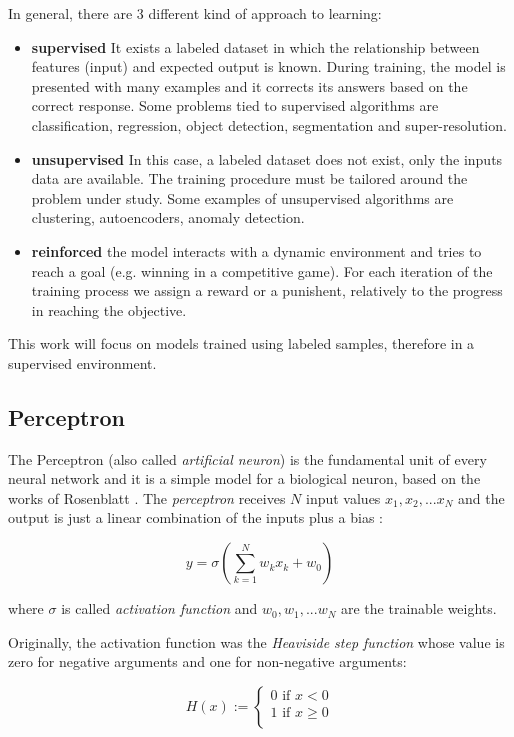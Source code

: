 \documentclass[12pt,a4paper]{report}
\begin{document}
In general, there are 3 different kind of approach to learning:

\begin{itemize}
 \item {\bf supervised} It exists a labeled dataset in which the relationship between features (input) and expected output is known. 
 During training, the model is presented with many examples and it corrects its answers based on the correct response.  
 Some problems tied to supervised algorithms are classification, regression, object detection, segmentation and super-resolution.
 \item {\bf unsupervised} In this case, a labeled dataset does not exist, only the inputs data are available. 
 The training procedure must be tailored around the problem under study. Some examples of unsupervised algorithms are clustering, autoencoders, anomaly detection.
 \item {\bf reinforced} the model interacts with a dynamic environment and tries to reach a goal (e.g. winning in a competitive game). 
 For each iteration of the training process we assign a reward or a punishent, relatively to the progress in reaching the objective.
\end{itemize}

This work will focus on models trained using labeled samples, therefore in a supervised environment.

\subsection*{Perceptron}

The Perceptron (also called \textit{artificial neuron}) is the fundamental unit of every neural network and it is a simple model for a biological neuron, based on the works of Rosenblatt \cite{perceptron}. 
The \textit{perceptron} receives $N$ input values $x_1, x_2, ... x_N$ and the output is just a linear combination of the inputs plus a bias :

\begin{equation}
y = \sigma(\sum_{k=1}^N w_kx_k + w_0)
\end{equation}

where $\sigma$ is called \textit{activation function} and $w_0, w_1, ... w_N$ are the trainable weights.

Originally, the activation function was the \textit{Heaviside step function} whose value is zero for negative arguments and one for non-negative arguments: 

\begin{equation}
H(x) := 
\begin{cases}
  0 \text{ if } x < 0 \\ 
  1 \text{ if } x \geq 0 \\
\end{cases}
\end{equation}
\end{document}
